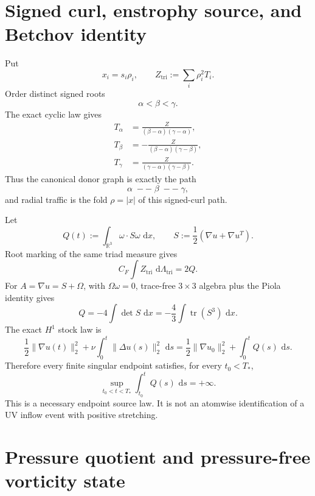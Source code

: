 \documentclass[11pt]{article}
\newcommand{\R}{\mathbb R}
\newcommand{\dd}{\,\mathrm d}
\newcommand{\tr}{\operatorname{tr}}
\begin{document}
\section{Signed curl, enstrophy source, and Betchov identity}

Put
\[
x_i=s_i\rho_i,
\qquad
Z_{\mathrm{tri}}:=\sum_i\rho_i^2T_i.
\]
Order distinct signed roots
\[
\alpha<\beta<\gamma.
\]
The exact cyclic law gives
\begin{align}
T_\alpha&=\frac{Z}{(\beta-\alpha)(\gamma-\alpha)},\label{eq:Talpha}\\
T_\beta&=-\frac{Z}{(\beta-\alpha)(\gamma-\beta)},\label{eq:Tbeta}\\
T_\gamma&=\frac{Z}{(\gamma-\alpha)(\gamma-\beta)}.\label{eq:Tgamma}
\end{align}
Thus the canonical donor graph is exactly the path
\[
\alpha\;--\;\beta\;--\;\gamma,
\]
and radial traffic is the fold $\rho=|x|$ of this signed-curl path.

Let
\begin{equation}\label{eq:Qdef}
Q(t):=\int_{\R^3}\omega\cdot S\omega\,\dd x,
\qquad
S:=\frac12(\nabla u+\nabla u^T).
\end{equation}
Root marking of the same triad measure gives
\begin{equation}\label{eq:ZtoQ}
\boxed{
C_F\int Z_{\mathrm{tri}}\,\dd\Lambda_{\mathrm{tri}}=2Q.
}
\end{equation}
For $A=\nabla u=S+\Omega$, with $\Omega\omega=0$, trace-free $3\times3$ algebra plus the Piola identity gives
\begin{equation}\label{eq:Betchov}
\boxed{
Q
=-4\int\det S\,\dd x
=-\frac43\int\tr(S^3)\,\dd x.
}
\end{equation}
The exact $H^1$ stock law is
\begin{equation}\label{eq:H1stock}
\boxed{
\frac12\|\nabla u(t)\|_2^2
+\nu\int_0^t\|\Delta u(s)\|_2^2\,\dd s
=
\frac12\|\nabla u_0\|_2^2
+\int_0^tQ(s)\,\dd s.
}
\end{equation}
Therefore every finite singular endpoint satisfies, for every $t_0<T_*$,
\begin{equation}\label{eq:Qunbounded}
\boxed{
\sup_{t_0<t<T_*}\int_{t_0}^tQ(s)\,\dd s=+\infty.
}
\end{equation}
This is a necessary endpoint source law.  It is not an atomwise identification of a UV inflow event with positive stretching.

\section{Pressure quotient and pressure-free vorticity state}
\end{document}
